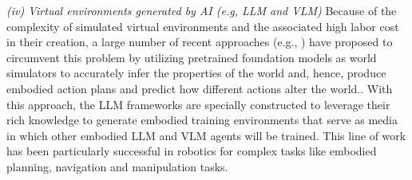 \documentclass[10pt,journal,compsoc]{IEEEtran}
\begin{document}
	
	
	\textit{(iv) Virtual environments generated by AI (e.g, LLM and VLM)}
	Because of the complexity of simulated virtual environments and the associated high labor cost in their creation, a large number of recent approaches (e.g., \cite{zala2024envgen,wang2024can,huang2023voxposer,wang2023bytesized32,liu2023llm+}) have proposed to circumvent this problem by utilizing pretrained foundation models as world simulators to accurately infer the properties of the world and, hence, produce embodied action plans and predict how different actions alter the world..  With this approach, the LLM frameworks are specially constructed to leverage their rich knowledge to generate embodied training environments that serve as media in which other embodied LLM \cite{yang2024embodied} and VLM \cite{yang2024embodied} agents will be trained. This line of work has been particularly successful in robotics for complex tasks like embodied planning, navigation and manipulation tasks. 
	
\end{document}
